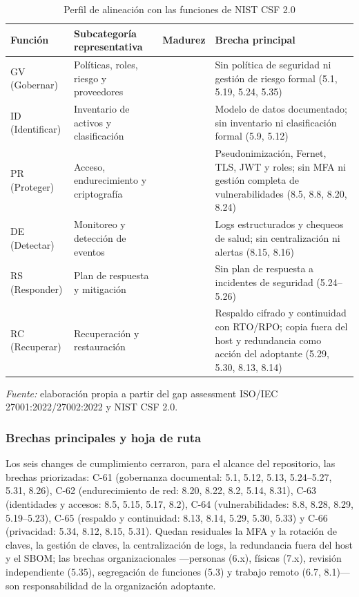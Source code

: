\begin{table}[htbp]
\centering
\caption{Perfil de alineación con las funciones de NIST CSF 2.0}
\label{tab:cumplimiento-nist}
\footnotesize\singlespacing
\setlength{\tabcolsep}{4pt}
\begin{tabular}{@{}>{\raggedright\arraybackslash}p{2.2cm} >{\raggedright\arraybackslash}p{3.7cm} >{\centering\arraybackslash}p{1.2cm} >{\raggedright\arraybackslash}p{8.7cm}@{}}
\toprule
\textbf{Función} & \textbf{Subcategoría representativa} & \textbf{Madurez} & \textbf{Brecha principal} \\
\midrule
GV (Gobernar) & Políticas, roles, riesgo y proveedores & 1 & Sin política de seguridad ni gestión de riesgo formal (5.1, 5.19, 5.24, 5.35) \\
ID (Identificar) & Inventario de activos y clasificación & 1 & Modelo de datos documentado; sin inventario ni clasificación formal (5.9, 5.12) \\
PR (Proteger) & Acceso, endurecimiento y criptografía & 2 & Pseudonimización, Fernet, TLS, JWT y roles; sin MFA ni gestión completa de vulnerabilidades (8.5, 8.8, 8.20, 8.24) \\
DE (Detectar) & Monitoreo y detección de eventos & 1 & Logs estructurados y chequeos de salud; sin centralización ni alertas (8.15, 8.16) \\
RS (Responder) & Plan de respuesta y mitigación & 0 & Sin plan de respuesta a incidentes de seguridad (5.24--5.26) \\
RC (Recuperar) & Recuperación y restauración & 2 & Respaldo cifrado y continuidad con RTO/RPO; copia fuera del host y redundancia como acción del adoptante (5.29, 5.30, 8.13, 8.14) \\
\bottomrule
\end{tabular}
\par
{\footnotesize\textit{Fuente:} elaboración propia a partir del gap assessment ISO/IEC 27001:2022/27002:2022 y NIST CSF 2.0.\par}
\end{table}

\subsubsection{Brechas principales y hoja de ruta}\label{subsec:cumplimiento-brechas}

Los seis changes de cumplimiento cerraron, para el alcance del repositorio, las brechas priorizadas: C-61 (gobernanza documental: 5.1, 5.12, 5.13, 5.24--5.27, 5.31, 8.26), C-62 (endurecimiento de red: 8.20, 8.22, 8.2, 5.14, 8.31), C-63 (identidades y accesos: 8.5, 5.15, 5.17, 8.2), C-64 (vulnerabilidades: 8.8, 8.28, 8.29, 5.19--5.23), C-65 (respaldo y continuidad: 8.13, 8.14, 5.29, 5.30, 5.33) y C-66 (privacidad: 5.34, 8.12, 8.15, 5.31). Quedan residuales la MFA y la rotación de claves, la gestión de claves, la centralización de logs, la redundancia fuera del host y el SBOM; las brechas organizacionales ---personas (6.x), físicas (7.x), revisión independiente (5.35), segregación de funciones (5.3) y trabajo remoto (6.7, 8.1)--- son responsabilidad de la organización adoptante.

